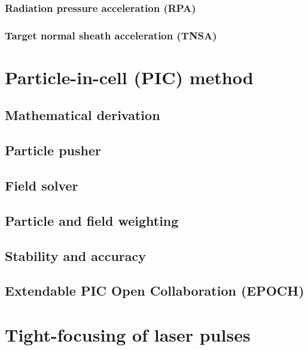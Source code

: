 \documentclass[12pt, twoside, a4paper, openright]{report}
\begin{document}
\subsection{Radiation pressure acceleration (RPA)}


\subsection{Target normal sheath acceleration (TNSA)}



\chapter{Particle-in-cell (PIC) method}


\section{Mathematical derivation}


\section{Particle pusher}


\section{Field solver}


\section{Particle and field weighting}


\section{Stability and accuracy}


\section{Extendable PIC Open Collaboration (EPOCH)}



\chapter{Tight-focusing of laser pulses}

\end{document}
